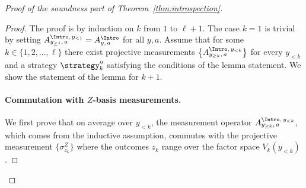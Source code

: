 \begin{proof}[Proof of the soundness part of Theorem~\ref{thm:introspection}]
  \begin{proof}

    The proof is by induction on $k$ from $1$ to $\ell+1$.
    The case $k=1$ is trivial by setting $A_{y_{\geq 1},\, a}^{\Intro,\, y_{<1}}
    = \ai[y,\, a]$ for all $y,a$.
    Assume that for some $k \in \{1, 2, \ldots, \ell\}$ there exist projective
    measurements $\bigl\{\aigek \bigr\}$ for every $y_{< k}$ and a strategy
    $\strategy''_k$ satisfying the conditions of the lemma statement.
    We show the statement of the lemma for $k+1$.

    \paragraph{Commutation with $Z$-basis measurements.}
    We first prove that on average over $y_{< k}$, the measurement operator
    $\aigek$, which comes from the inductive assumption, commutes with the
    projective measurement $\{\sigma^Z_{z_k}\}$ where the outcomes $z_k$ range
    over the factor space $V_k(y_{<k})$.


\end{proof}
\end{proof}
